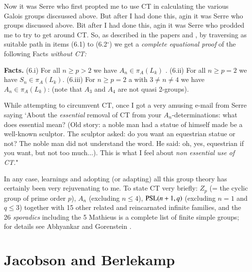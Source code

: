 Now it was Serre who first propted me to use CT in calculating the various Galois groups discsussed above. But after I had done this, agin it was Serre who groups discussed above. Bit after I had done this, agin it was Serre who prodded me to try to get around CT. So, as described in the papers \cite{chap1-key8} and \cite{chap1-key10}, by traversing as suitable path in items (6.1) to (6.2$^{\circ}$) we get a \textit{complete equational proof} of the following Facts \textit{without CT:}

\medskip
\noindent
\textbf{Facts.} (6.i) For all $n \geq p > 2$ we have $A_{n}\in \pi_{A}(L_{k})$ . (6.ii) For all $n\geq p = 2$ we have $S_{n} \in \pi_{A}(L_{k})$. (6.iii) For $n \geq p =2$ a with $3\neq n \neq 4$ we have $A_{n}\in\pi_{A}(L_{k})$: (note that $A_{3}$ and $A_{4}$ are not quasi 2-groups).

While attempting to circumvent CT, once I got a very amusing e-mail from Serre saying `About the \textit{essential} removal of CT from your $A_{n}$-determinations: what does essential mean? (Old story: a noble man had a statue of himself made be a well-known sculptor. The sculptor asked: do you want an equestrian statue or not? The noble man did not understand the word. He said: oh, yes, equestrian if you want, but not too much$\ldots$). This is what I feel about \textit{non essential use of CT.}"

 In any case, learnings and adopting (or adapting) all this group theory has certainly been very rejuvenating to me. To state CT very briefly: $Z_{p}$ (= the cyclic group of prime order $p$), $A_{n}$ (excluding $n\leq 4$), $\operatorname{PSL}(n+1, q)$ (excluding $n=1$ and $q \leq 3$) together with 15 other related and reincarnated infinite families, and the 26 \textit{sporadics} including the 5 Mathieus is a complete list of finite simple groups; for details see Abhyankar \cite{chap1-key8} and Gorenstein \cite{chap1-key32}.

\section{Jacobson and Berlekamp}\label{chap1-sec7}
\pageoriginale

